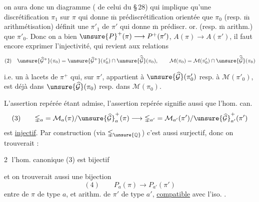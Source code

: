 on aura donc un diagramme ( de celui du \S\,28)
qui  implique qu'une discrétification $\pi_1$ sur $\pi$ qui donne $\overline{\mathrm m}$ prédiscrétification orientée que $\pi_0$ (resp. $\overline{\mathrm m}$ arithmétisation) définit une  $\pi'_1$ de $\pi'$ qui donne $\overline{\mathrm m}$ prédiscr. or. (resp. $\overline{\mathrm m}$ arithm.) que $\pi'_0$. Donc on a bien $\unsure{P}^{+}(\pi)\longrightarrow P^+(\pi')$, $A(\pi)\longrightarrow A(\pi')$, il faut encore exprimer l'injectivité, qui revient aux relations
\[
\begin{gathered}
(2)\quad
\unsure{\widehat{\mathcal G}^{+}}(\pi_0)
=
\unsure{\widehat{\mathcal G}^{+}}(\pi'_0)\cap
\unsure{\widehat{\widehat{\mathcal G}}}(\pi_0),\qquad
\mathcal M(\pi_0)=\mathcal M(\pi'_0)\cap
\unsure{\widehat{\widehat{\mathcal G}}}(\pi_0)
\end{gathered}
\]

i.e. un  à lacets de $\pi^{+}$ qui, sur $\pi'$, appartient à $\unsure{\widehat{\mathcal G}}(\pi'_0)$  resp. à $\mathcal M(\pi'_0)$, est déjà dans $\unsure{\widehat{\mathcal G}}(\pi_0)$ resp. dans $\mathcal M(\pi_0)$.

L'assertion  repérée étant admise, l'assertion  repérée signifie aussi que l'hom. can.
\[
(3)\qquad
\mathbb{\Gamma}_a=\mathcal M_a(\pi)/\unsure{\widehat{\mathcal G}}^{+}_a(\pi)
\longrightarrow
\mathbb{\Gamma}_{a'}=\mathcal M_{a'}(\pi')/\unsure{\widehat{\mathcal G}}^{+}_{a'}(\pi')
\]
est \uline{injectif}. Par construction (via $\mathbb{\Gamma}_{\unsure{\mathbb Q}}$) c'est aussi surjectif, donc on trouverait :

\textcircled{2} l'hom. canonique (3) est bijectif

et on trouverait aussi une bijection
\[
(4)\qquad P_a(\pi)\longrightarrow P_{a'}(\pi')
\]
entre  de $\pi$ de type $a$, et arithm. de $\pi'$ de type $a'$, \uline{compatible} avec l'iso. .

